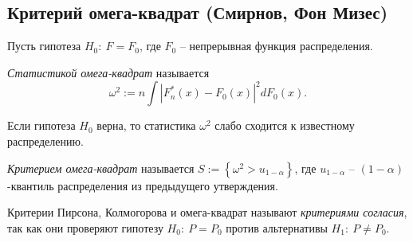 \subsection{Критерий омега-квадрат (Смирнов, Фон Мизес)}

Пусть гипотеза $\displaystyle H_{0} :\ F=F_{0}$, где $\displaystyle F_{0}$ -- непрерывная функция распределения.
\begin{definition}
    \textit{Статистикой омега-квадрат} называется
    \begin{equation*}
        \omega ^{2} :=n\int \left| F_{n}^{*}( x) -F_{0}( x)\right| ^{2} dF_{0}( x) .
    \end{equation*}
\end{definition}
\begin{proposition}
    Если гипотеза $\displaystyle H_{0}$ верна, то статистика $\displaystyle \omega ^{2}$ слабо сходится к известному распределению.
\end{proposition}
\begin{definition}
    \textit{Критерием омега-квадрат} называется $\displaystyle S:=\left\{\omega ^{2}  >u_{1-\alpha }\right\}$, где $\displaystyle u_{1-\alpha }$ -- $\displaystyle ( 1-\alpha )$-квантиль распределения из предыдущего утверждения.
\end{definition}
\begin{definition}
    Критерии Пирсона, Колмогорова и омега-квадрат называют \textit{критериями согласия}, так как они проверяют гипотезу $\displaystyle H_{0} :\ P=P_{0}$ против альтернативы $\displaystyle H_{1} :\ P\neq P_{0}$.
\end{definition}